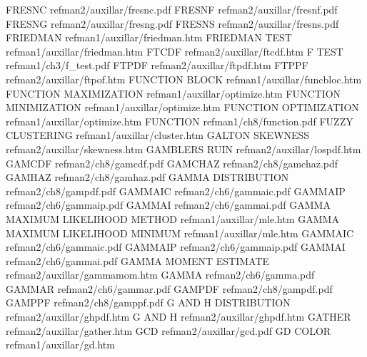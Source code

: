 FRESNC                                  refman2/auxillar/fresnc.pdf
FRESNF                                  refman2/auxillar/fresnf.pdf
FRESNG                                  refman2/auxillar/fresng.pdf
FRESNS                                  refman2/auxillar/fresns.pdf
FRIEDMAN                                refman1/auxillar/friedman.htm
FRIEDMAN TEST                           refman1/auxillar/friedman.htm
FTCDF                                   refman2/auxillar/ftcdf.htm
F TEST                                  refman1/ch3/f_test.pdf
FTPDF                                   refman2/auxillar/ftpdf.htm
FTPPF                                   refman2/auxillar/ftpof.htm
FUNCTION BLOCK                          refman1/auxillar/funcbloc.htm
FUNCTION MAXIMIZATION                   refman1/auxillar/optimize.htm
FUNCTION MINIMIZATION                   refman1/auxillar/optimize.htm
FUNCTION OPTIMIZATION                   refman1/auxillar/optimize.htm
FUNCTION                                refman1/ch8/function.pdf
FUZZY CLUSTERING                        refman1/auxillar/cluster.htm
GALTON SKEWNESS                         refman2/auxillar/skewness.htm
GAMBLERS RUIN                           refman2/auxillar/lospdf.htm
GAMCDF                                  refman2/ch8/gamcdf.pdf
GAMCHAZ                                 refman2/ch8/gamchaz.pdf
GAMHAZ                                  refman2/ch8/gamhaz.pdf
GAMMA DISTRIBUTION                      refman2/ch8/gampdf.pdf
GAMMAIC                                 refman2/ch6/gammaic.pdf
GAMMAIP                                 refman2/ch6/gammaip.pdf
GAMMAI                                  refman2/ch6/gammai.pdf
GAMMA MAXIMUM LIKELIHOOD METHOD         refman1/auxillar/mle.htm
GAMMA MAXIMUM LIKELIHOOD MINIMUM        refman1/auxillar/mle.htm
GAMMAIC                                 refman2/ch6/gammaic.pdf
GAMMAIP                                 refman2/ch6/gammaip.pdf
GAMMAI                                  refman2/ch6/gammai.pdf
GAMMA MOMENT ESTIMATE                   refman2/auxillar/gammamom.htm
GAMMA                                   refman2/ch6/gamma.pdf
GAMMAR                                  refman2/ch6/gammar.pdf
GAMPDF                                  refman2/ch8/gampdf.pdf
GAMPPF                                  refman2/ch8/gamppf.pdf
G AND H DISTRIBUTION                    refman2/auxillar/ghpdf.htm
G AND H                                 refman2/auxillar/ghpdf.htm
GATHER                                  refman2/auxillar/gather.htm
GCD                                     refman2/auxillar/gcd.pdf
GD COLOR                                refman1/auxillar/gd.htm
